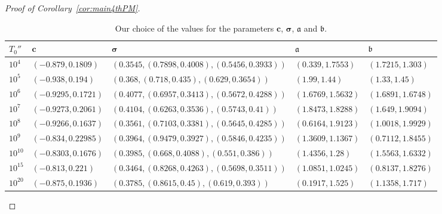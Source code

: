 \documentclass[a4paper,reqno]{amsart}
\theoremstyle{definition}
\begin{document}
\begin{proof}[Proof of Corollary~\ref{cor:main4thPM}]
\begin{table}[h]
\centering
\footnotesize{
\begin{tabular}{lllll} 
\toprule
$T_0''$ & $\bm{c}$ & $\bm{\sigma}$ & $\bm{\mathfrak{a}}$ & $\bm{\mathfrak{b}}$ \\ 
\midrule
$10^4$ & $(-0.879,0.1809)$ & $(0.3545,(0.7898,0.4008),(0.5456,0.3933))$ & $(0.339,1.7553)$ & $(1.7215,1.303)$ \\
$10^5$ & $(-0.938,0.194)$ & $(0.368,(0.718,0.435),(0.629,0.3654))$ & $(1.99,1.44)$ & $(1.33,1.45)$ \\
$10^6$ & $(-0.9295,0.1721)$ & $(0.4077,(0.6957,0.3413),(0.5672,0.4288))$ & $(1.6769,1.5632)$ & $(1.6891,1.6748)$ \\
$10^7$ & $(-0.9273,0.2061)$ & $(0.4104,(0.6263,0.3536),(0.5743,0.41))$ & $(1.8473,1.8288)$ & $(1.649,1.9094)$ \\
$10^8$ & $(-0.9266,0.1637)$ & $(0.3561,(0.7103,0.3381),(0.5645,0.4285))$ & $(0.6164,1.9123)$ & $(1.0018,1.9929)$ \\
$10^9$ & $(-0.834,0.22985)$ & $(0.3964,(0.9479,0.3927),(0.5846,0.4235))$ & $(1.3609,1.1367)$ & $(0.7112,1.8455)$ \\
$10^{10}$ & $(-0.8303,0.1676)$ & $(0.3985,(0.668,0.4088),(0.551,0.386))$ & $(1.4356,1.28)$ & $(1.5563,1.6332)$ \\
$10^{15}$ & $(-0.813,0.221)$ & $(0.3464,(0.8268,0.4263),(0.5698,0.3511))$ & $(1.0851,1.0245)$ & $(0.8137,1.8276)$ \\
$10^{20}$ & $(-0.875,0.1936)$ & $(0.3785,(0.8615,0.45),(0.619,0.393))$ & $(0.1917,1.525)$ & $(1.1358,1.717)$ \\
\bottomrule
\end{tabular}}
\caption{Our choice of the values for the parameters $\bm{c}$, $\bm{\sigma}$, $\bm{\mathfrak{a}}$ and $\bm{\mathfrak{b}}$.} 
\label{tab:ProofCorMain4thPM}
\end{table}


\end{proof}
\end{document}
